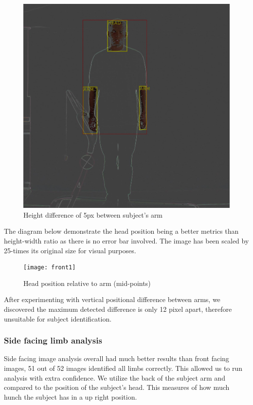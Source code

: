 \documentclass[10pt,journal,compsoc]{IEEEtran}
\begin{document}
\begin{figure}
    \centering
    \includegraphics[width=0.8\linewidth]{frontFacing}
    \caption{Height difference of 5px between subject's arm}
\end{figure}

The diagram below demonstrate the head position being a better metrics than height-width ratio as there is no error bar involved. The image has been scaled by 25-times its original size for visual purposes.

\begin{figure}
\centering
\texttt{[image: front1]}
    \caption{Head position relative to arm (mid-points)}
\end{figure}

After experimenting with vertical positional difference between arms, we discovered the maximum detected difference is only 12 pixel apart, therefore unsuitable for subject identification.




\subsubsection{Side facing limb analysis}
Side facing image analysis overall had much better results than front facing images, 51 out of 52 images identified all limbs correctly. This allowed us to run analysis with extra confidence. We utilize the back of the subject arm and compared to the position of the subject's head. This measures of how much hunch the subject has in a up right position. 
\end{document}
